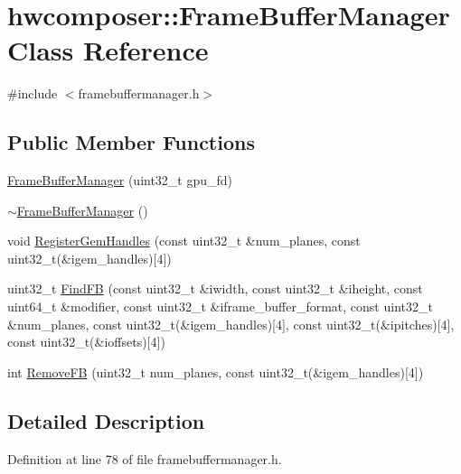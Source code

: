 \hypertarget{classhwcomposer_1_1FrameBufferManager}{}\section{hwcomposer\+:\+:Frame\+Buffer\+Manager Class Reference}
\label{classhwcomposer_1_1FrameBufferManager}


{\ttfamily \#include $<$framebuffermanager.\+h$>$}

\subsection*{Public Member Functions}
\begin{DoxyCompactItemize}
\item 
\mbox{\hyperlink{classhwcomposer_1_1FrameBufferManager_a8f45d7e5a1fa710844b3a1584821fa06}{Frame\+Buffer\+Manager}} (uint32\+\_\+t gpu\+\_\+fd)
\item 
\mbox{\hyperlink{classhwcomposer_1_1FrameBufferManager_ad0e2c6b841fa8384c0da6727d1ee3ac8}{$\sim$\+Frame\+Buffer\+Manager}} ()
\item 
void \mbox{\hyperlink{classhwcomposer_1_1FrameBufferManager_aab2dd56fad91e4504cb846b7b73d8caf}{Register\+Gem\+Handles}} (const uint32\+\_\+t \&num\+\_\+planes, const uint32\+\_\+t(\&igem\+\_\+handles)\mbox{[}4\mbox{]})
\item 
uint32\+\_\+t \mbox{\hyperlink{classhwcomposer_1_1FrameBufferManager_a05c6f8e84120746c4aa6fede497142e0}{Find\+FB}} (const uint32\+\_\+t \&iwidth, const uint32\+\_\+t \&iheight, const uint64\+\_\+t \&modifier, const uint32\+\_\+t \&iframe\+\_\+buffer\+\_\+format, const uint32\+\_\+t \&num\+\_\+planes, const uint32\+\_\+t(\&igem\+\_\+handles)\mbox{[}4\mbox{]}, const uint32\+\_\+t(\&ipitches)\mbox{[}4\mbox{]}, const uint32\+\_\+t(\&ioffsets)\mbox{[}4\mbox{]})
\item 
int \mbox{\hyperlink{classhwcomposer_1_1FrameBufferManager_a77843c241c2631819a637f227dbc273d}{Remove\+FB}} (uint32\+\_\+t num\+\_\+planes, const uint32\+\_\+t(\&igem\+\_\+handles)\mbox{[}4\mbox{]})
\end{DoxyCompactItemize}


\subsection{Detailed Description}


Definition at line 78 of file framebuffermanager.\+h.



